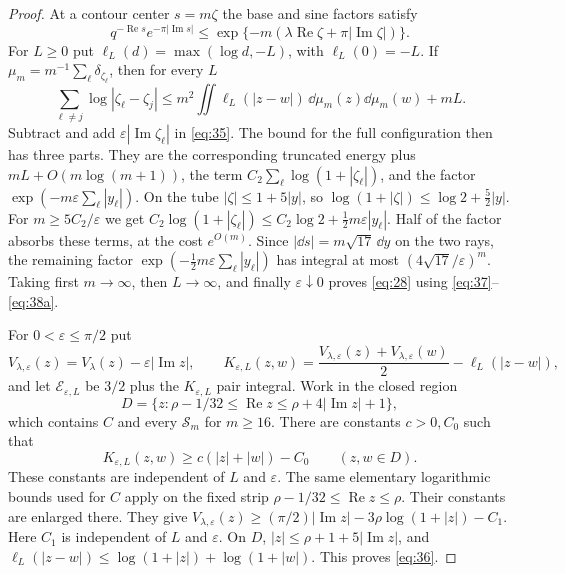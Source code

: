 \begin{proof}
At a contour center $s=m\zeta$ the base and sine factors satisfy
\[
 q^{-\operatorname{Re} s}e^{-\pi|\operatorname{Im} s|}
 \le \exp\{-m(\lambda\operatorname{Re}\zeta+\pi|\operatorname{Im}\zeta|)\}.
\]
For $L\ge0$
 put $\ell_L(d)=\max(\log d,-L)$, with $\ell_L(0)=-L$. If
$\mu_m=m^{-1}\sum_\ell\delta_{\zeta_\ell}$, then for every $L$
\begin{equation}
 \sum_{\ell\ne j}\log|\zeta_\ell-\zeta_j|
 \le m^2\iint\ell_L(|z-w|)\,\dd\mu_m(z)\dd\mu_m(w)+mL. \label{eq:35a}
\end{equation}
Subtract and add $\varepsilon|\operatorname{Im}\zeta_\ell|$ in \eqref{eq:35}. The bound for the full
configuration then has three parts. They are the corresponding truncated
energy plus $mL+O(m\log(m+1))$, the term $C_2\sum_\ell\log(1+|\zeta_\ell|)$, and the
factor $\exp(-m\varepsilon\sum_\ell|y_\ell|)$. On the tube
$|\zeta|\le1+5|y|$, so $\log(1+|\zeta|)\le\log2+\frac52|y|$. For
$m\ge5C_2/\varepsilon$ we get
$C_2\log(1+|\zeta_\ell|)\le C_2\log2+\frac12m\varepsilon|y_\ell|$. Half of
the factor absorbs these terms, at the cost $e^{O(m)}$. Since
$|\dd s|=m\sqrt{17}\,\dd y$ on the two rays, the remaining factor
$\exp(-\frac12m\varepsilon\sum_\ell|y_\ell|)$ has integral at most
$(4\sqrt{17}/\varepsilon)^m$. Taking first $m\to\infty$, then $L\to\infty$,
and finally $\varepsilon\downarrow0$ proves \eqref{eq:28} using
\eqref{eq:37}--\eqref{eq:38a}.


For $0<\varepsilon\le\pi/2$ put
\[
 V_{\lambda,\varepsilon}(z)=V_\lambda(z)-\varepsilon|\operatorname{Im} z|,\qquad
 K_{\varepsilon,L}(z,w)=\frac{V_{\lambda,\varepsilon}(z)+V_{\lambda,\varepsilon}(w)}2
                         -\ell_L(|z-w|),
\]
and let ${\mathcal E}_{\varepsilon,L}$ be $3/2$ plus the $K_{\varepsilon,L}$
pair integral. Work in the closed region
\[
 D=\{z:\rho-1/32\le\operatorname{Re} z\le\rho+4|\operatorname{Im} z|+1\},
\]
which contains $C$ and every $\mathcal S_m$ for $m\ge16$. There are
constants $c>0,C_0$ such that
\begin{equation}
 K_{\varepsilon,L}(z,w)\ge c(|z|+|w|)-C_0\qquad(z,w\in D).       \label{eq:36}
\end{equation}
These constants are independent of $L$ and $\varepsilon$. The same
elementary logarithmic bounds used for $C$ apply on the fixed strip
$\rho-1/32\le\operatorname{Re}z\le\rho$. Their constants are enlarged
there.
They give
$V_{\lambda,\varepsilon}(z)\ge(\pi/2)|\operatorname{Im} z|-3\rho\log(1+|z|)-C_1$.
Here $C_1$ is independent of $L$ and $\varepsilon$.
On $D$, $|z|\le\rho+1+5|\operatorname{Im} z|$, and
$\ell_L(|z-w|)\le\log(1+|z|)+\log(1+|w|)$. This proves \eqref{eq:36}.


\end{proof}
